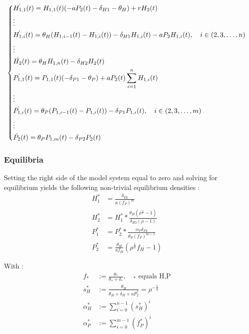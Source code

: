 \documentclass[12pt,a4paper,onecolumn]{article}
\begin{document}
\begin{equation}
\begin{dcases}
\dot{H_{1,1}}(t) = H_{1,1}(t)(-a P_2(t) - \delta_{H1} - \theta_H) + r H_2(t) \\
\vdots \\
\dot{H_{1,i}}(t) = \theta_H(H_{1,i-1}(t) - H_{1,i}(t)) - \delta_{H1} H_{1,i}(t) - aP_2H_{1,i}(t), \quad i \in (2, 3, \dots, n) \\
\vdots \\
\dot{H_{2}}(t) = \theta_H H_{1,n}(t) - \delta_{H2} H_{2}(t) \\
\dot{P_{1,1}}(t) = P_{1,1}(t)(- \delta_{P1} - \theta_P) + a P_2(t) \sum_{i=1}^{n} H_{1,i}(t) \\
\vdots \\
\dot{P_{1,i}}(t) = \theta_P(P_{1,i-1}(t) - P_{1,i}(t)) - \delta_{P1} P_{1,i}(t), \quad i \in (2, 3, \dots, m) \\
\vdots \\
\dot{P_{2}}(t) = \theta_P P_{1,m}(t) - \delta_{P2} P_{2}(t) \\
\end{dcases}
\end{equation}

\subsubsection{Equilibria}

Setting the right side of the model system equal to zero and solving for equilibrium yields the following non-trivial equilibrium densities :
\begin{align}
H_1^* &= \frac{\delta_{P2}}{a(f_P)^m} \nonumber \\
H_2^* &= H_1^* * \frac{\theta_{H} (\rho^{\frac{1}{n}}-1)}{\delta_{H2} (\rho-1)} \nonumber \\
P_1^* &= P_2^* * \frac{\alpha_P \delta_{P2}}{\theta_P (f_P)^{m-1}}  \\
P_2^*&= \frac{\theta_H}{a f_H} (\rho^{\frac{1}{n}}f_H -1) \nonumber
\end{align}

With :
\begin{align}
f_* &:= \frac{\theta_*}{\theta_* + \delta_*}, \quad \text{$_*$ equals H,P} \nonumber  \\
s_H^* &:= \frac{\theta_H}{\theta_H + \delta_H + aP_2^*} = \rho^{-\frac{1}{n}} \nonumber \\
\alpha_H^* &:= \sum_{i=0}^{n-1} (s_H^*)^i   \\
\alpha_P^* &:= \sum_{i=0}^{m-1} (f_P^*)^i \nonumber
\end{align}
\end{document}
